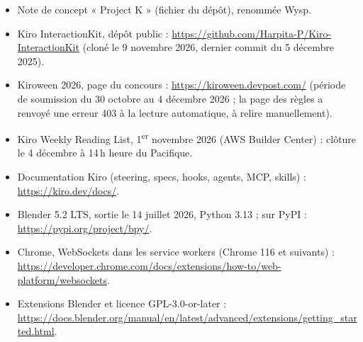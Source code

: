 \begin{itemize}[leftmargin=1.2em]
  \item Note de concept « Project K » (fichier  du dépôt), renommée Wysp.
  \item Kiro InteractionKit, dépôt public : \url{https://github.com/Harpita-P/Kiro-InteractionKit} (cloné le 9 novembre 2026, dernier commit du 5 décembre 2025).
  \item Kiroween 2026, page du concours : \url{https://kiroween.devpost.com/} (période de soumission du 30 octobre au 4 décembre 2026 ; la page des règles a renvoyé une erreur 403 à la lecture automatique, à relire manuellement).
  \item Kiro Weekly Reading List, 1\textsuperscript{er} novembre 2026 (AWS Builder Center) : clôture le 4 décembre à 14\,h heure du Pacifique.
  \item Documentation Kiro (steering, specs, hooks, agents, MCP, skills) : \url{https://kiro.dev/docs/}.
  \item Blender 5.2 LTS, sortie le 14 juillet 2026, Python 3.13 ;  sur PyPI : \url{https://pypi.org/project/bpy/}.
  \item Chrome, WebSockets dans les service workers (Chrome 116 et suivants) : \url{https://developer.chrome.com/docs/extensions/how-to/web-platform/websockets}.
  \item Extensions Blender et licence GPL-3.0-or-later : \url{https://docs.blender.org/manual/en/latest/advanced/extensions/getting_started.html}.
\end{itemize}
